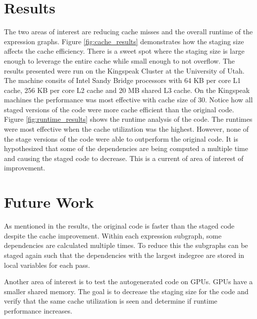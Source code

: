 \documentclass[sigconf,]{acmart}
\begin{document}
\section{Results}
The two areas of interest are reducing cache misses and the overall runtime of the expression graphs. Figure \ref{fig:cache_results} demonstrates how the staging size affects the cache efficiency. There is a sweet spot where the staging size is large enough to leverage the entire cache while small enough to not overflow. The results presented were run on the Kingspeak Cluster at the University of Utah. The machine consits of Intel Sandy Bridge processors with 64 KB per core L1 cache, 256 KB per core L2 cache and 20 MB shared L3 cache. On the Kingspeak machines the performance was most effective with cache size of 30. Notice how all staged versions of the code were more cache efficient than the original code. 
Figure \ref{fig:runtime_results} shows the runtime analysis of the code. The runtimes were most effective when the cache utilization was the highest. However, none of the stage versions of the code were able to outperform the original code. It is hypothesized that some of the dependencies are being computed a multiple time and causing the staged code to decrease. This is a current of area of interest of improvement.


\section{Future Work}
As mentioned in the results, the original code is faster than the staged code despite the cache improvement. Within each expression subgraph, some dependencies are calculated multiple times. To reduce this the subgraphs can be staged again such that the dependencies with the largest indegree are stored in local variables for each pass.

Another area of interest is to test the autogenerated code on GPUs. GPUs have a smaller shared memory. The goal is to decrease the staging size for the code and verify that the same cache utilization is seen and determine if runtime performance increases.




\end{document}
